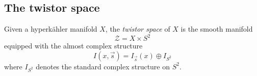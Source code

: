 \documentclass[12pt,letterpaper,reqno]{article}
\numberwithin{equation}{section}
\newcommand{\cZ}{\ensuremath{\mathcal Z}}
\newcommand{\hk}{hyperk\"ahler\xspace}
\newcommand{\ti}[1]{\textit{#1}}
\newcommand{\fixme}[1]{{\color{blue}{[#1]}}}
\begin{document}
\begin{pf} \fixme{...}
\end{pf}


\subsection{The twistor space}

\begin{defn} Given a \hk manifold $X$, the \ti{twistor space} of $X$ is the smooth manifold
\begin{equation}
  \cZ = X \times S^2
\end{equation}
equipped with the almost complex structure
\begin{equation}
  I(x,\vec s) = I_{\vec s}(x) \oplus I_{S^2}
\end{equation}
where $I_{S^2}$ denotes the 
standard complex structure on $S^2$.
\end{defn}
\end{document}

